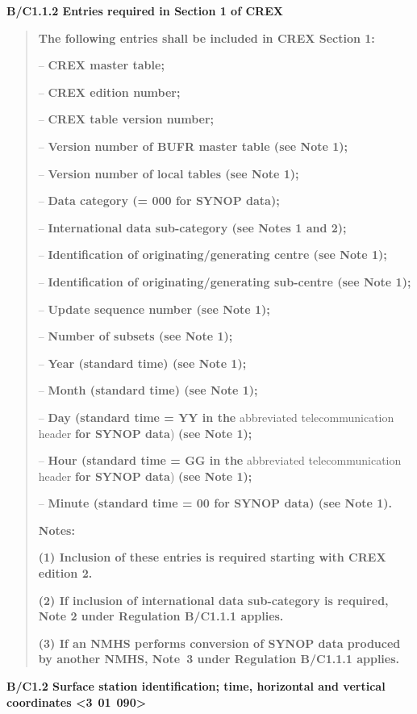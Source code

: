 \textbf{B/C1.1.2 Entries required in Section 1 of CREX}

\begin{quote}
\textbf{The following entries shall be included in CREX Section 1:}

-- \textbf{CREX master table;}

-- \textbf{CREX edition number;}

-- \textbf{CREX table version number;}

-- \textbf{Version number of BUFR master table (see Note 1);}

-- \textbf{Version number of local tables (see Note 1);}

-- \textbf{Data category (= 000 for SYNOP data);}

-- \textbf{International data sub-category (see Notes 1 and 2);}

-- \textbf{Identification of originating/generating centre (see Note 1);}

-- \textbf{Identification of originating/generating sub-centre (see Note 1);}

-- \textbf{Update sequence number (see Note 1);}

-- \textbf{Number of subsets (see Note 1);}

-- \textbf{Year (standard time) (see Note 1);}

-- \textbf{Month (standard time) (see Note 1);}

-- \textbf{Day (standard time = YY in the} abbreviated telecommunication header \textbf{for SYNOP data}) \textbf{(see Note 1);}

-- \textbf{Hour (standard time = GG in the} abbreviated telecommunication header \textbf{for SYNOP data}) \textbf{(see Note 1);}

-- \textbf{Minute (standard time = 00 for SYNOP data) (see Note 1).}

\textbf{Notes:}

\textbf{(1) Inclusion of these entries is required starting with CREX edition 2.}

\textbf{(2) If inclusion of international data sub-category is required, Note 2 under Regulation B/C1.1.1 applies.}

\textbf{(3) If an NMHS performs conversion of SYNOP data produced by another NMHS, Note~3 under Regulation B/C1.1.1 applies.}
\end{quote}

\textbf{B/C1.2 Surface station identification; time, horizontal and vertical coordinates \textless3}~\textbf{01}~\textbf{090\textgreater{}}

